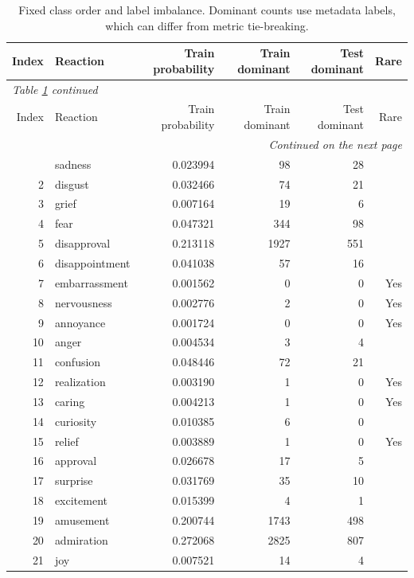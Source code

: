 \begingroup
\small
\setlength{\tabcolsep}{4pt}
\begin{longtable}{rlrrrr}
\caption{Fixed class order and label imbalance. Dominant counts use metadata labels, which can differ from metric tie-breaking.}\label{tab:classes}\\
\toprule
Index & Reaction & Train probability & Train dominant & Test dominant & Rare \\
\midrule\endfirsthead
\multicolumn{6}{l}{\textit{Table \ref{tab:classes} continued}}\\
\toprule
Index & Reaction & Train probability & Train dominant & Test dominant & Rare \\
\midrule\endhead
\midrule\multicolumn{6}{r}{\textit{Continued on the next page}}\\\endfoot
\bottomrule\endlastfoot
1 & sadness & 0.023994 & 98 & 28 &  \\
2 & disgust & 0.032466 & 74 & 21 &  \\
3 & grief & 0.007164 & 19 & 6 &  \\
4 & fear & 0.047321 & 344 & 98 &  \\
5 & disapproval & 0.213118 & 1927 & 551 &  \\
6 & disappointment & 0.041038 & 57 & 16 &  \\
7 & embarrassment & 0.001562 & 0 & 0 & Yes \\
8 & nervousness & 0.002776 & 2 & 0 & Yes \\
9 & annoyance & 0.001724 & 0 & 0 & Yes \\
10 & anger & 0.004534 & 3 & 4 &  \\
11 & confusion & 0.048446 & 72 & 21 &  \\
12 & realization & 0.003190 & 1 & 0 & Yes \\
13 & caring & 0.004213 & 1 & 0 & Yes \\
14 & curiosity & 0.010385 & 6 & 0 &  \\
15 & relief & 0.003889 & 1 & 0 & Yes \\
16 & approval & 0.026678 & 17 & 5 &  \\
17 & surprise & 0.031769 & 35 & 10 &  \\
18 & excitement & 0.015399 & 4 & 1 &  \\
19 & amusement & 0.200744 & 1743 & 498 &  \\
20 & admiration & 0.272068 & 2825 & 807 &  \\
21 & joy & 0.007521 & 14 & 4 &  \\
\end{longtable}
\endgroup
